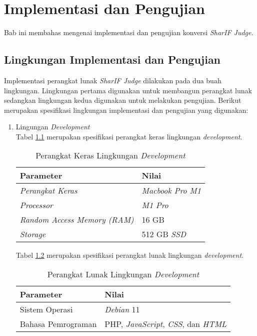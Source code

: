 \chapter{Implementasi dan Pengujian}
\label{chap:implementasidanpengujian}
Bab ini membahas mengenai implementasi dan pengujian konversi \textit{SharIF Judge}.
\section{Lingkungan Implementasi dan Pengujian}
Implementasi perangkat lunak \textit{SharIF Judge} dilakukan pada dua buah lingkungan. Lingkungan pertama digunakan untuk membangun perangkat lunak sedangkan lingkungan kedua digunakan untuk melakukan pengujian. Berikut merupakan spesifikasi lingkungan implementasi dan pengujian yang digunakan:

\begin{enumerate}
	\item Lingungan \textit{Development}\\
	Tabel \ref{tab:devhard} merupakan spesifikasi perangkat keras lingkungan \textit{development}.
	\begin{table}[H]
 	\caption{Perangkat Keras Lingkungan \textit{Development}}
	\label{tab:devhard}
    \centering
    	\begin{tabular}{|l|l|}
    	\hline
        	\textbf{Parameter} & \textbf{Nilai} \\ \hline
        	\textit{Perangkat Keras} & \textit{Macbook Pro M1} \\ \hline
        	\textit{Processor} & \textit{M1 Pro} \\ \hline
        	\textit{Random Access Memory (RAM)} & 16 GB \\ \hline
        	\textit{Storage} & 512 GB \textit{SSD} \\ \hline
    	\end{tabular}
	\end{table}
	Tabel \ref{tab:devsoft} merupakan spesifikasi perangkat lunak lingkungan \textit{development}.
 	\begin{table}[H]
 	\caption{Perangkat Lunak Lingkungan \textit{Development}}
	\label{tab:devsoft}
    \centering
    	\begin{tabular}{|l|l|}
    	\hline
        	\textbf{Parameter} & \textbf{Nilai} \\ \hline
        	Sistem Operasi & \textit{Debian} 11 \\ \hline
        	Bahasa Pemrograman & PHP, \textit{JavaScript}, \textit{CSS}, dan \textit{HTML} \\ \hline

\end{tabular}
\end{table}
\end{enumerate}

